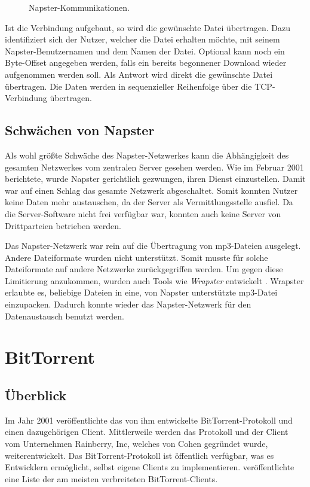 \begin{figure}[]
    \centering
    
    \caption{Napster-Kommunikationen.}
    \label{fig:NapsterCommunications}
\end{figure}

Ist die Verbindung aufgebaut, so wird die gewünschte Datei übertragen. Dazu identifiziert sich der Nutzer, welcher die Datei erhalten möchte, mit seinem Napster-Benutzer\-namen und dem Namen der Datei. Optional kann noch ein Byte-Offset angegeben werden, falls ein bereits begonnener Download wieder aufgenommen werden soll. Als Antwort wird direkt die gewünschte Datei übertragen. Die Daten werden in sequenzieller Reihenfolge über die TCP-Verbindung übertragen. 

\subsection{Schwächen von Napster}
Als wohl größte Schwäche des Napster-Netzwerkes kann die Abhängigkeit des gesamten Netzwerkes vom zentralen Server gesehen werden. Wie \textcite{napsterCourtRuling} im Februar 2001 berichtete, wurde Napster gerichtlich gezwungen, ihren Dienst einzustellen. Damit war auf einen Schlag das gesamte Netzwerk abgeschaltet. Somit konnten Nutzer keine Daten mehr austauschen, da der Server als Vermittlungsstelle ausfiel. Da die Server-Software nicht frei verfügbar war, konnten auch keine Server von Drittparteien betrieben werden.

Das Napster-Netzwerk war rein auf die Übertragung von mp3-Dateien ausgelegt. Andere Dateiformate wurden nicht unterstützt. Somit musste für solche Dateiformate auf andere Netzwerke zurückgegriffen werden. Um gegen diese Limitierung anzukommen, wurden auch Tools wie \emph{Wrapster} entwickelt \parencite{napsterWrapster}. Wrapster erlaubte es, beliebige Dateien in eine, von Napster unterstützte mp3-Datei einzupacken. Dadurch konnte wieder das Napster-Netzwerk für den Datenaustausch benutzt werden.

\section{BitTorrent}

\subsection{Überblick}
Im Jahr 2001 veröffentlichte \textcite{BitTorrentRelease} das von ihm entwickelte BitTorrent-Protokoll und einen dazugehörigen Client. Mittlerweile werden das Protokoll und der Client vom Unternehmen Rainberry, Inc, welches von Cohen gegründet wurde, weiterentwickelt. Das BitTorrent-Protokoll ist öffentlich verfügbar, was es Entwicklern ermöglicht, selbst eigene Clients zu implementieren. \textcite{BitTorrentClientMarketshare} veröffentlichte eine Liste der am meisten verbreiteten BitTorrent-Clients. 

